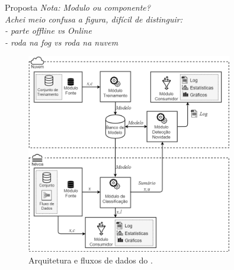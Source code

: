 \documentclass[aspectratio=43,10pt]{beamer}
\newcommand{\nota}[1]{\hspace*{-0.5cm}\textit{{\color[rgb]{1,0,0}Nota: #1}}}
\begin{document}
\begin{frame}[fragile]{Proposta}
\nota{Modulo ou componente?\\
Achei meio confusa a figura, difícil de distinguir:\\
- parte offline vs Online\\
- roda na fog vs roda na nuvem}
\begin{figure}[h]
  \centering
  \includegraphics[width=0.8\textwidth]{figuras/mfog-arch-v2_pt-br.png}
  \caption{Arquitetura e fluxos de dados do \mfog.}
  \label{fig:arch}
\end{figure}
\end{frame}
\end{document}

